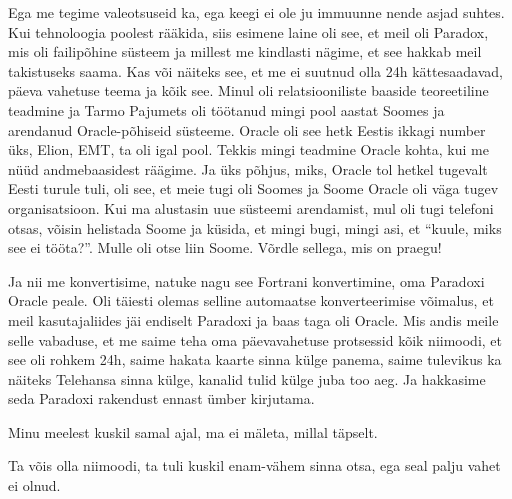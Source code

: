 
Ega me tegime valeotsuseid ka, ega keegi ei ole ju immuunne nende asjad suhtes. Kui tehnoloogia poolest rääkida, siis  esimene laine oli see, et meil oli Paradox, mis oli failipõhine süsteem ja millest me kindlasti nägime, et see hakkab meil takistuseks saama. Kas või näiteks see, et me ei suutnud olla 24h kättesaadavad, päeva vahetuse teema ja kõik see. Minul oli relatsiooniliste baaside  teoreetiline teadmine ja Tarmo Pajumets oli töötanud mingi pool aastat Soomes ja arendanud Oracle-põhiseid süsteeme. Oracle oli see hetk  Eestis ikkagi number üks, Elion, EMT, ta oli igal pool. Tekkis mingi teadmine Oracle kohta, kui me nüüd andmebaasidest räägime. Ja üks põhjus, miks, Oracle tol hetkel tugevalt Eesti turule tuli,  oli see, et meie tugi oli Soomes ja Soome Oracle oli väga tugev organisatsioon. Kui ma alustasin uue süsteemi arendamist,  mul oli tugi telefoni otsas, võisin helistada Soome ja küsida, et mingi bugi, mingi asi, et \enquote{kuule, miks see ei tööta?}. Mulle oli otse liin Soome. Võrdle sellega, mis on praegu!

Ja nii me konvertisime,  natuke nagu see Fortrani konvertimine, oma Paradoxi Oracle peale.  Oli täiesti olemas selline automaatse konverteerimise võimalus, et meil kasutajaliides jäi endiselt Paradoxi ja baas taga oli Oracle. Mis andis meile selle vabaduse, et me saime teha oma päevavahetuse protsessid kõik niimoodi, et see oli rohkem 24h, saime hakata kaarte sinna külge panema, saime  tulevikus ka näiteks Telehansa sinna külge, kanalid tulid külge juba too aeg. Ja hakkasime seda Paradoxi rakendust ennast ümber kirjutama. 


Minu meelest kuskil samal ajal, ma ei mäleta, millal täpselt.


Ta võis olla niimoodi, ta tuli kuskil enam-vähem sinna otsa, ega seal palju vahet ei olnud. 

